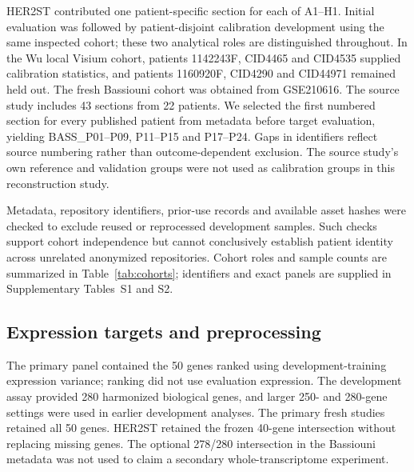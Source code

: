 HER2ST\cite{andersson2021} contributed one patient-specific section for each of A1--H1. Initial evaluation was followed by patient-disjoint calibration development using the same inspected cohort; these two analytical roles are distinguished throughout. In the Wu local Visium cohort\cite{wu2021}, patients 1142243F, CID4465 and CID4535 supplied calibration statistics, and patients 1160920F, CID4290 and CID44971 remained held out. The fresh Bassiouni cohort was obtained from GSE210616\cite{bassiouni2023}. The source study includes 43 sections from 22 patients. We selected the first numbered section for every published patient from metadata before target evaluation, yielding BASS\_P01--P09, P11--P15 and P17--P24. Gaps in identifiers reflect source numbering rather than outcome-dependent exclusion. The source study's own reference and validation groups were not used as calibration groups in this reconstruction study.

Metadata, repository identifiers, prior-use records and available asset hashes were checked to exclude reused or reprocessed development samples. Such checks support cohort independence but cannot conclusively establish patient identity across unrelated anonymized repositories. Cohort roles and sample counts are summarized in Table~\ref{tab:cohorts}; identifiers and exact panels are supplied in Supplementary Tables~S1 and S2.

\subsection{Expression targets and preprocessing}
The primary panel contained the 50 genes ranked using development-training expression variance; ranking did not use evaluation expression. The development assay provided 280 harmonized biological genes, and larger 250- and 280-gene settings were used in earlier development analyses. The primary fresh studies retained all 50 genes. HER2ST retained the frozen 40-gene intersection without replacing missing genes. The optional 278/280 intersection in the Bassiouni metadata was not used to claim a secondary whole-transcriptome experiment.

